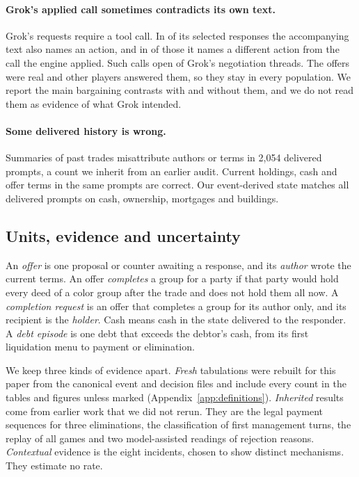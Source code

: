 \paragraph{Grok's applied call sometimes contradicts its own text.} Grok's requests require a tool call. In  of its  selected responses the accompanying text also names an action, and in  of those it names a different action from the call the engine applied. Such calls open  of Grok's  negotiation threads. The offers were real and other players answered them, so they stay in every population. We report the main bargaining contrasts with and without them, and we do not read them as evidence of what Grok intended.

\paragraph{Some delivered history is wrong.} Summaries of past trades misattribute authors or terms in 2,054 delivered prompts, a count we inherit from an earlier audit. Current holdings, cash and offer terms in the same prompts are correct. Our event-derived state matches all  delivered prompts on cash, ownership, mortgages and buildings.

\subsection{Units, evidence and uncertainty}

An \emph{offer} is one proposal or counter awaiting a response, and its \emph{author} wrote the current terms. An offer \emph{completes} a group for a party if that party would hold every deed of a color group after the trade and does not hold them all now. A \emph{completion request} is an offer that completes a group for its author only, and its recipient is the \emph{holder}. Cash means cash in the state delivered to the responder. A \emph{debt episode} is one debt that exceeds the debtor's cash, from its first liquidation menu to payment or elimination.

We keep three kinds of evidence apart. \emph{Fresh} tabulations were rebuilt for this paper from the canonical event and decision files and include every count in the tables and figures unless marked (Appendix~\ref{app:definitions}). \emph{Inherited} results come from earlier work that we did not rerun. They are the legal payment sequences for three eliminations, the classification of first management turns, the replay of all games and two model-assisted readings of rejection reasons. \emph{Contextual} evidence is the eight incidents, chosen to show distinct mechanisms. They estimate no rate.

